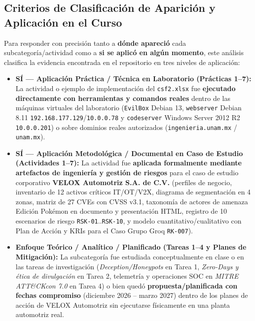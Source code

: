 \documentclass[letterpaper,11pt]{article}
\begin{document}
\subsection{Criterios de Clasificación de Aparición y Aplicación en el Curso}

Para responder con precisión tanto a \textbf{dónde apareció} cada subcategoría/actividad como a \textbf{si se aplicó en algún momento}, este análisis clasifica la evidencia encontrada en el repositorio en tres niveles de aplicación:

\begin{itemize}[leftmargin=1.0cm, itemsep=2pt]
    \item \colorbox{badgePractica}{\textbf{SÍ --- Aplicación Práctica / Técnica en Laboratorio (Prácticas 1--7):}} La actividad o ejemplo de implementación del \texttt{csf2.xlsx} fue \textbf{ejecutado directamente con herramientas y comandos reales} dentro de las máquinas virtuales del laboratorio (\texttt{EvilBox} Debian 13, \texttt{webserver} Debian 8.11 \texttt{192.168.177.129}/\texttt{10.0.0.78} y \texttt{codeserver} Windows Server 2012 R2 \texttt{10.0.0.201}) o sobre dominios reales autorizados (\texttt{ingenieria.unam.mx} / \texttt{unam.mx}).
    \item \colorbox{badgeVelox}{\textbf{SÍ --- Aplicación Metodológica / Documental en Caso de Estudio (Actividades 1--7):}} La actividad fue \textbf{aplicada formalmente mediante artefactos de ingeniería y gestión de riesgos} para el caso de estudio corporativo \textbf{VELOX Automotriz S.A. de C.V.} (perfiles de negocio, inventario de 12 activos críticos IT/OT/V2X, diagrama de segmentación en 4 zonas, matriz de 27 CVEs con CVSS v3.1, taxonomía de actores de amenaza Edición Pokémon en documento y presentación HTML, registro de 10 escenarios de riesgo \texttt{RSK-01}..\texttt{RSK-10}, y modelo cuantitativo/cualitativo con Plan de Acción y KRIs para el Caso Grupo Groq \texttt{RK-007}).
    \item \colorbox{badgeTeorico}{\textbf{Enfoque Teórico / Analítico / Planificado (Tareas 1--4 y Planes de Mitigación):}} La subcategoría fue estudiada conceptualmente en clase o en las tareas de investigación (\textit{Deception/Honeypots} en Tarea 1, \textit{Zero-Days y ética de divulgación} en Tarea 2, telemetría y operaciones SOC en \textit{MITRE ATT\&CKcon 7.0} en Tarea 4) o bien quedó \textbf{propuesta/planificada con fechas compromiso} (diciembre 2026 -- marzo 2027) dentro de los planes de acción de VELOX Automotriz sin ejecutarse físicamente en una planta automotriz real.
\end{itemize}
\end{document}
